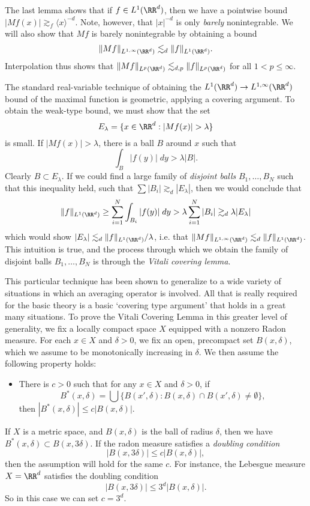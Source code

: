 The last lemma shows that if $f \in L^1(\RR^d)$, then we have a pointwise bound $|Mf(x)| \gtrsim_f \langle x \rangle^{-d}$. Note, however, that $|x|^{-d}$ is only \emph{barely} nonintegrable. We will also show that $Mf$ is barely nonintegrable by obtaining a bound
%
\[ \| Mf \|_{L^{1,\infty}(\RR^d)} \lesssim_d \| f \|_{L^1(\RR^d)}. \]
%
Interpolation thus shows that $\| Mf \|_{L^p(\RR^d)} \lesssim_{d,p} \| f \|_{L^p(\RR^d)}$ for all $1 < p \leq \infty$.

The standard real-variable technique of obtaining the $L^1(\RR^d) \to L^{1,\infty}(\RR^d)$ bound of the maximal function is geometric, applying a covering argument. To obtain the weak-type bound, we must show that the set
%
\[ E_\lambda = \{ x \in \RR^d : |Mf(x)| > \lambda \} \]
%
is small. If $|Mf(x)| > \lambda$, there is a ball $B$ around $x$ such that
%
\[ \int_B |f(y)|\; dy > \lambda |B|. \]
%
Clearly $B \subset E_\lambda$. If we could find a large family of \emph{disjoint balls} $B_1,\dots,B_N$ such that this inequality held, such that $\sum |B_i| \gtrsim_d |E_\lambda|$, then we would conclude that
%
\[ \| f \|_{L^1(\RR^d)} \geq \sum_{i = 1}^N \int_{B_i} |f(y)|\; dy > \lambda \sum_{i = 1}^N |B_i| \gtrsim_d \lambda |E_\lambda| \]
%
which would show $|E_\lambda| \lesssim_d \| f \|_{L^1(\RR^d)} / \lambda$, i.e. that $\| Mf \|_{L^{1,\infty}(\RR^d)} \lesssim_d \| f \|_{L^1(\RR^d)}$. This intuition is true, and the process through which we obtain the family of disjoint balls $B_1,\dots,B_N$ is through the \emph{Vitali covering lemma}.

This particular technique has been shown to generalize to a wide variety of situations in which an averaging operator is involved. All that is really required for the basic theory is a basic `covering type argument' that holds in a great many situations. To prove the Vitali Covering Lemma in this greater level of generality, we fix a locally compact space $X$ equipped with a nonzero Radon measure. For each $x \in X$ and $\delta > 0$, we fix an open, precompact set $B(x,\delta)$, which we assume to be monotonically increasing in $\delta$. We then assume the following property holds:
%
\begin{itemize}
    \item There is $c > 0$ such that for any $x \in X$ and $\delta > 0$, if
    \[ B^*(x,\delta) = \bigcup \{ B(x',\delta): B(x,\delta) \cap B(x',\delta) \neq \emptyset \}, \]
    then $|B^*(x,\delta)| \leq c |B(x,\delta)|$.
\end{itemize}
%
If $X$ is a metric space, and $B(x,\delta)$ is the ball of radius $\delta$, then we have $B^*(x,\delta) \subset B(x,3\delta)$. If the radon measure satisfies a \emph{doubling condition}
%
\[ |B(x,3\delta)| \leq c |B(x,\delta)|, \]
%
then the assumption will hold for the same $c$. For instance, the Lebesgue measure $X = \RR^d$ satisfies the doubling condition
%
\[ |B(x,3\delta)| \leq 3^d |B(x,\delta)|. \]
%
So in this case we can set $c = 3^d$.

